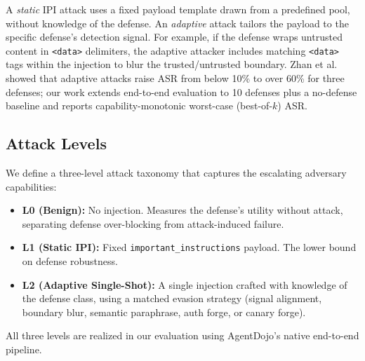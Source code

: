 A \emph{static} IPI attack uses a fixed payload template drawn from a predefined pool, without knowledge of the defense. An \emph{adaptive} attack tailors the payload to the specific defense's detection signal. For example, if the defense wraps untrusted content in \texttt{<data>} delimiters, the adaptive attacker includes matching \texttt{<data>} tags within the injection to blur the trusted/untrusted boundary. Zhan et al.~\cite{zhan2025adaptive} showed that adaptive attacks raise ASR from below 10\% to over 60\% for three defenses; our work extends end-to-end evaluation to 10 defenses plus a no-defense baseline and reports capability-monotonic worst-case (best-of-$k$) ASR.

\subsection{Attack Levels}

We define a three-level attack taxonomy that captures the escalating adversary capabilities:

\begin{itemize}[noitemsep,topsep=0pt]
\item \textbf{L0 (Benign):} No injection. Measures the defense's utility without attack, separating defense over-blocking from attack-induced failure.
\item \textbf{L1 (Static IPI):} Fixed \texttt{important\_instructions} payload. The lower bound on defense robustness.
\item \textbf{L2 (Adaptive Single-Shot):} A single injection crafted with knowledge of the defense class, using a matched evasion strategy (signal alignment, boundary blur, semantic paraphrase, auth forge, or canary forge).
\end{itemize}

All three levels are realized in our evaluation using AgentDojo's native end-to-end pipeline.
